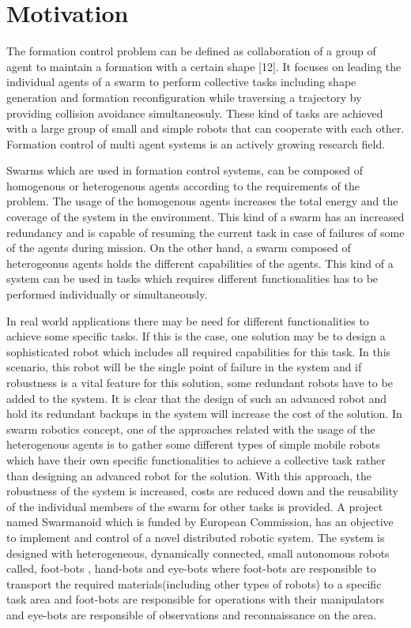 \section{Motivation}
The formation control problem can be defined as collaboration of a group of agent to maintain a formation with a certain shape [12]. It focuses on leading the individual agents of a swarm to perform  collective tasks including shape generation and formation reconfiguration while traversing a trajectory by providing collision avoidance simultaneosuly. These kind of tasks are achieved with a large group of small and simple robots  that can cooperate with each other. Formation control of multi agent systems  is an actively growing research field.

Swarms which are used in formation control systems, can be composed of homogenous or heterogenous agents according to the requirements of the problem. The usage of the homogenous agents increases the total energy and the coverage of the system in the environment. This kind of a swarm has an increased redundancy and is capable of resuming the current task in case of failures of some of the agents during mission. On the other hand, a swarm composed of heterogeonus agents holds the different capabilities of the agents. This kind of a system can be used in tasks which requires different functionalities has to be performed individually or simultaneously.

In real world applications there may be need for different  functionalities to achieve some specific tasks. If this is the case, one solution may be to design a sophisticated robot which includes all required capabilities for this task. In this scenario, this robot will be the single point of failure in the system and if robustness is a  vital feature for this solution, some redundant robots have to be added to the system. It is clear that the design of such an advanced robot and hold its redundant backups in the system will increase the cost of the solution. In swarm robotics concept, one of the approaches related with the usage of the heterogenous agents is to gather some different types of simple mobile robots which have their own specific functionalities to achieve a collective task rather than designing an advanced robot for the solution. With this approach, the robustness of the system is increased, costs are reduced down and the reusability of the individual members of the swarm for other tasks is provided.  A project named Swarmanoid which is funded by European Commission, has an objective to implement and control of a novel distributed robotic system. The system is designed with heterogeneous, dynamically connected, small autonomous robots called,  foot-bots , hand-bots and eye-bots where foot-bots are responsible to transport the required materials(including other types of robots) to a specific task area and foot-bots are responsible for operations with their manipulators and eye-bots are responsible of observations and reconnaissance on the area.

